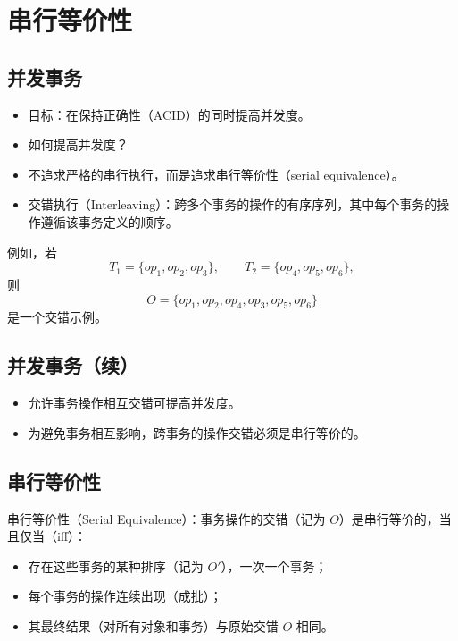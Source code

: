 \section{串行等价性}

\subsection{并发事务}

\begin{itemize}
  \item 目标：在保持正确性（ACID）的同时提高并发度。
  \item 如何提高并发度？
  \item 不追求严格的串行执行，而是追求串行等价性（serial equivalence）。
  \item 交错执行（Interleaving）：跨多个事务的操作的有序序列，其中每个事务的操作遵循该事务定义的顺序。
\end{itemize}

例如，若
\[
T_1=\{\mathit{op}_1,\mathit{op}_2,\mathit{op}_3\}, \qquad
T_2=\{\mathit{op}_4,\mathit{op}_5,\mathit{op}_6\},
\]
则
\[
O=\{\mathit{op}_1,\mathit{op}_2,\mathit{op}_4,\mathit{op}_3,\mathit{op}_5,\mathit{op}_6\}
\]
是一个交错示例。

\subsection{并发事务（续）}

\begin{itemize}
  \item 允许事务操作相互交错可提高并发度。
  \item 为避免事务相互影响，跨事务的操作交错必须是串行等价的。
\end{itemize}

\subsection{串行等价性}

串行等价性（Serial Equivalence）：事务操作的交错（记为 $O$）是串行等价的，当且仅当（iff）：

\begin{itemize}
  \item 存在这些事务的某种排序（记为 $O'$），一次一个事务；
  \item 每个事务的操作连续出现（成批）；
  \item 其最终结果（对所有对象和事务）与原始交错 $O$ 相同。
\end{itemize}


